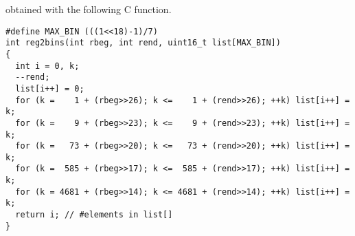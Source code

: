 \documentclass[10pt]{article}
\begin{document}
\begin{itemize}
  obtained with the following C function.
\begin{verbatim}
#define MAX_BIN (((1<<18)-1)/7)
int reg2bins(int rbeg, int rend, uint16_t list[MAX_BIN])
{
  int i = 0, k;
  --rend;
  list[i++] = 0;
  for (k =    1 + (rbeg>>26); k <=    1 + (rend>>26); ++k) list[i++] = k;
  for (k =    9 + (rbeg>>23); k <=    9 + (rend>>23); ++k) list[i++] = k;
  for (k =   73 + (rbeg>>20); k <=   73 + (rend>>20); ++k) list[i++] = k;
  for (k =  585 + (rbeg>>17); k <=  585 + (rend>>17); ++k) list[i++] = k;
  for (k = 4681 + (rbeg>>14); k <= 4681 + (rend>>14); ++k) list[i++] = k;
  return i; // #elements in list[]
}
\end{verbatim}
\end{itemize}
\end{document}
